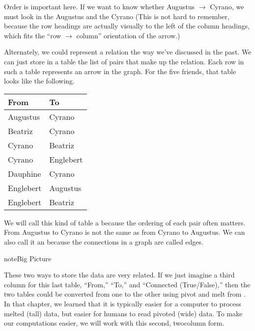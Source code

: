 \documentclass[letterpaper,10pt,english]{sphinxmanual}
\begin{document}
Order is important here.  If we want to know whether Augustus \(\to\) Cyrano, we must look in the Augustus  and the Cyrano   (This is not hard to remember, because the row headings are actually visually to the left of the column headings, which fits the “row \(\to\) column” orientation of the arrow.)

Alternately, we could represent a relation the way we’ve discussed in the past.  We can just store in a table the list of pairs that make up the relation.  Each row in such a table represents an arrow in the graph.  For the five friends, that table looks like the following.


\begin{savenotes}\sphinxattablestart
\centering
\begin{tabulary}{\linewidth}[t]{|T|T|}
\hline
\sphinxstyletheadfamily 
From
&\sphinxstyletheadfamily 
To
\\
\hline
Augustus
&
Cyrano
\\
\hline
Beatriz
&
Cyrano
\\
\hline
Cyrano
&
Beatriz
\\
\hline
Cyrano
&
Englebert
\\
\hline
Dauphine
&
Cyrano
\\
\hline
Englebert
&
Augustus
\\
\hline
Englebert
&
Beatriz
\\
\hline
\end{tabulary}
\par
\sphinxattableend\end{savenotes}

We will call this kind of table a  because the ordering of each pair often matters.  From Augustus to Cyrano is not the same as from Cyrano to Augustus.  We can also call it an  because the connections in a graph are called edges.

\begin{sphinxadmonition}{note}{Big Picture}

These two ways to store the data are very related.  If we just imagine a third column for this last table, “From,” “To,” and “Connected (True/False),” then the two tables could be converted from one to the other using pivot and melt from {\hyperref[\detokenize{chapter-6-single-table-verbs::doc}]{}}.  In that chapter, we learned that it is typically easier for a computer to process melted (tall) data, but easier for humans to read pivoted (wide) data.  To make our computations easier, we will work with this second, two\sphinxhyphen{}column form.
\end{sphinxadmonition}
\end{document}
